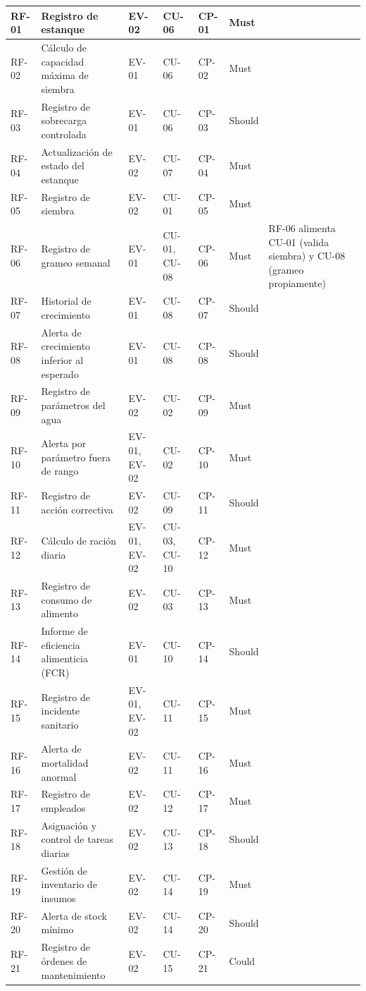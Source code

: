 \documentclass[11pt,a4paper]{article}
\begin{document}
\begin{longtable}{|p{1.4cm}|p{4.3cm}|p{1.6cm}|p{1.6cm}|p{1.6cm}|p{1cm}|p{2.7cm}|}
RF-01 & Registro de estanque & EV-02 & CU-06 & CP-01 & Must & \\ \hline
RF-02 & Cálculo de capacidad máxima de siembra & EV-01 & CU-06 & CP-02 & Must & \\ \hline
RF-03 & Registro de sobrecarga controlada & EV-01 & CU-06 & CP-03 & Should & \\ \hline
RF-04 & Actualización de estado del estanque & EV-02 & CU-07 & CP-04 & Must & \\ \hline
RF-05 & Registro de siembra & EV-02 & CU-01 & CP-05 & Must & \\ \hline
RF-06 & Registro de grameo semanal & EV-01 & CU-01, CU-08 & CP-06 & Must & RF-06 alimenta CU-01 (valida siembra) y CU-08 (grameo propiamente) \\ \hline
RF-07 & Historial de crecimiento & EV-01 & CU-08 & CP-07 & Should & \\ \hline
RF-08 & Alerta de crecimiento inferior al esperado & EV-01 & CU-08 & CP-08 & Should & \\ \hline
RF-09 & Registro de parámetros del agua & EV-02 & CU-02 & CP-09 & Must & \\ \hline
RF-10 & Alerta por parámetro fuera de rango & EV-01, EV-02 & CU-02 & CP-10 & Must & \\ \hline
RF-11 & Registro de acción correctiva & EV-02 & CU-09 & CP-11 & Should & \\ \hline
RF-12 & Cálculo de ración diaria & EV-01, EV-02 & CU-03, CU-10 & CP-12 & Must & \\ \hline
RF-13 & Registro de consumo de alimento & EV-02 & CU-03 & CP-13 & Must & \\ \hline
RF-14 & Informe de eficiencia alimenticia (FCR) & EV-01 & CU-10 & CP-14 & Should & \\ \hline
RF-15 & Registro de incidente sanitario & EV-01, EV-02 & CU-11 & CP-15 & Must & \\ \hline
RF-16 & Alerta de mortalidad anormal & EV-02 & CU-11 & CP-16 & Must & \\ \hline
RF-17 & Registro de empleados & EV-02 & CU-12 & CP-17 & Must & \\ \hline
RF-18 & Asignación y control de tareas diarias & EV-02 & CU-13 & CP-18 & Should & \\ \hline
RF-19 & Gestión de inventario de insumos & EV-02 & CU-14 & CP-19 & Must & \\ \hline
RF-20 & Alerta de stock mínimo & EV-02 & CU-14 & CP-20 & Should & \\ \hline
RF-21 & Registro de órdenes de mantenimiento & EV-02 & CU-15 & CP-21 & Could & \\ \hline

\end{longtable}
\end{document}
